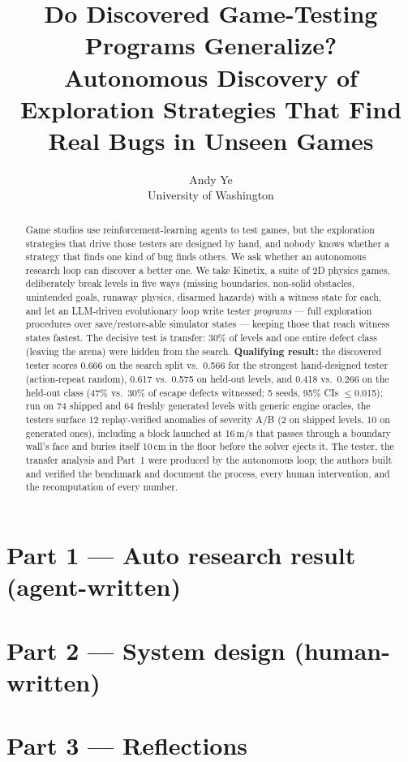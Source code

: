 \documentclass[11pt]{article}
\title{Do Discovered Game-Testing Programs Generalize?\\Autonomous Discovery of Exploration Strategies That Find Real Bugs in Unseen Games}
\author{Andy Ye \\ University of Washington}
\begin{document}
\maketitle
\begin{abstract}
Game studios use reinforcement-learning agents to test games, but the exploration strategies that drive those testers are designed by
hand, and nobody knows whether a strategy that finds one kind of bug finds others. We ask whether an autonomous research loop can
discover a better one. We take Kinetix, a suite of 2D physics games, deliberately break levels in five ways (missing boundaries,
non-solid obstacles, unintended goals, runaway physics, disarmed hazards) with a witness state for each, and let an LLM-driven
evolutionary loop write tester \emph{programs} --- full exploration procedures over save/restore-able simulator states --- keeping
those that reach witness states fastest. The decisive test is transfer: 30\% of levels and one entire defect class (leaving the arena)
were hidden from the search. \textbf{Qualifying result:} the discovered tester scores 0.666 on the search split vs.\ 0.566 for the strongest
hand-designed tester (action-repeat random), 0.617 vs.\ 0.575 on held-out levels, and 0.418 vs.\ 0.266 on the held-out class (47\% vs.\ 30\% of escape defects witnessed; 5 seeds, 95\% CIs $\le$0.015); run on
74 shipped and 64 freshly generated levels with generic engine oracles, the testers surface 12 replay-verified anomalies of severity A/B
(2 on shipped levels, 10 on generated ones), including a block launched at 16\,m/s that passes through a boundary wall's face and buries itself
10\,cm in the floor before the solver ejects it.
The tester, the transfer analysis and Part~1 were produced by the autonomous loop; the authors built and verified the benchmark and
document the process, every human intervention, and the recomputation of every number.
\end{abstract}

\section*{Part 1 --- Auto research result (agent-written)}


\section*{Part 2 --- System design (human-written)}


\section*{Part 3 --- Reflections}




\end{document}
